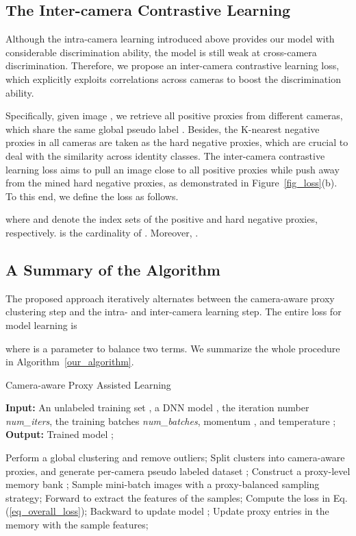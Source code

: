 \documentclass[letterpaper]{article} \usepackage{aaai21}  \usepackage{times}  \usepackage{helvet} \usepackage{courier}  \usepackage[hyphens]{url}  \usepackage{graphicx} \usepackage{subcaption}
\begin{document}
\subsection{The Inter-camera Contrastive Learning}
Although the intra-camera learning introduced above provides our model with considerable discrimination ability, the model is still weak at cross-camera discrimination. Therefore, we propose an inter-camera contrastive learning loss, which explicitly exploits correlations across cameras to boost the discrimination ability. 


Specifically, given image , we retrieve all positive proxies from different cameras, which share the same global pseudo label . Besides, the K-nearest negative proxies in all cameras are taken as the hard negative proxies, which are crucial to deal with the similarity across identity classes. The inter-camera contrastive learning loss aims to pull an image close to all positive proxies while push away from the mined hard negative proxies, as demonstrated in Figure~\ref{fig_loss}(b). To this end, we define the loss as follows. 

where  and  denote the index sets of the positive and hard negative proxies, respectively.  is the cardinality of . Moreover, .  





\subsection{A Summary of the Algorithm}
The proposed approach iteratively alternates between the camera-aware proxy clustering step and the intra- and inter-camera learning step. The entire loss for model learning is 

where  is a parameter to balance two terms. We summarize the whole procedure in Algorithm~\ref{our_algorithm}. 

\begin{algorithm}[h]{
\caption{Camera-aware Proxy Assisted Learning}
\label{our_algorithm}
\hspace*{0.02in} {\bf Input:}
An unlabeled training set , a DNN model , the iteration number \textit{num\_iters}, the training batches \textit{num\_batches}, momentum , and temperature ; \\
\hspace*{0.02in} {\bf Output:}
Trained model ;
\begin{algorithmic}[1]
    \State Perform a global clustering and remove outliers;
    \State Split clusters into camera-aware proxies, and generate per-camera pseudo labeled dataset ;
		\State Construct a proxy-level memory bank ;
        \State Sample mini-batch images with a proxy-balanced sampling strategy;
        \State Forward to extract the features of the samples;
        \State Compute the loss in Eq.(\ref{eq_overall_loss});
        \State Backward to update model ;
        \State Update proxy entries in the memory with the sample features;
    \EndFor
\EndFor
\end{algorithmic}
}
\end{algorithm}
\end{document}
